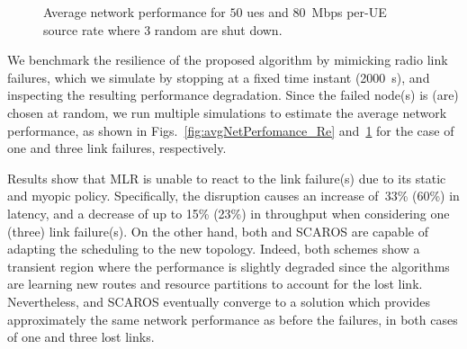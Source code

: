 \begin{figure}[t!]
\centering
{}
  
\caption{Average network performance for $50$ \glspl{ue} and $80$~Mbps per-UE source rate where 3 random \nodes{} are shut down.}
  \label{fig:avgNetPerfomance_Re2}
\end{figure}

We benchmark the resilience of the proposed algorithm by mimicking radio link failures, which we simulate by stopping \nodes{} at a fixed time instant (2000~s), and inspecting the resulting performance degradation.
Since the failed node(s) is (are) chosen at random, we run multiple simulations to estimate the average network performance, as shown in Figs.~\ref{fig:avgNetPerfomance_Re} and~\ref{fig:avgNetPerfomance_Re2} for the case of one and three link failures, respectively.

Results show that MLR is unable to react to the link failure(s) due to its static and myopic policy. Specifically, the disruption causes an increase of~33\% (60\%) in latency, and a decrease of up to 15\% (23\%) in throughput when considering one (three) link failure(s).
On the other hand, both \name{} and SCAROS are capable of adapting the scheduling to the new topology. Indeed, both schemes show a transient region where the performance is slightly degraded since the algorithms are learning new routes and resource partitions to account for the lost link. Nevertheless, \name{} and SCAROS eventually converge to a solution which provides approximately the same network performance as before the failures, in both cases of one and three lost links.

